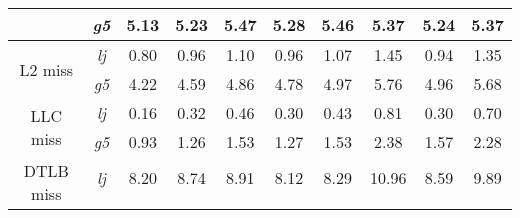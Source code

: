 \begin{table}[h!]
\begin{tabular}{|ccccc|ccccc|}
\multicolumn{1}{|c|}{}                                    & \multicolumn{1}{c|}{\emph{g5}}            & \multicolumn{1}{c|}{5.13}                          & \multicolumn{1}{c|}{5.23}                             & 5.47                         & \multicolumn{1}{c|}{5.28}       & \multicolumn{1}{c|}{5.46}        & \multicolumn{1}{c|}{5.37}                         & \multicolumn{1}{c|}{5.24}       & 5.37        \\ \hline
\multicolumn{1}{|c|}{\multirow{2}{*}{L2 miss}}            & \multicolumn{1}{c|}{\emph{lj}}            & \multicolumn{1}{c|}{0.80}                          & \multicolumn{1}{c|}{0.96}                             & 1.10                         & \multicolumn{1}{c|}{0.96}       & \multicolumn{1}{c|}{1.07}        & \multicolumn{1}{c|}{1.45}                         & \multicolumn{1}{c|}{0.94}       & 1.35        \\ \cline{2-10} 
\multicolumn{1}{|c|}{}                                    & \multicolumn{1}{c|}{\emph{g5}}            & \multicolumn{1}{c|}{4.22}                          & \multicolumn{1}{c|}{4.59}                             & 4.86                         & \multicolumn{1}{c|}{4.78}       & \multicolumn{1}{c|}{4.97}        & \multicolumn{1}{c|}{5.76}                         & \multicolumn{1}{c|}{4.96}       & 5.68        \\ \hline
\multicolumn{1}{|c|}{\multirow{2}{*}{LLC miss}}           & \multicolumn{1}{c|}{\emph{lj}}            & \multicolumn{1}{c|}{0.16}                          & \multicolumn{1}{c|}{0.32}                             & 0.46                         & \multicolumn{1}{c|}{0.30}       & \multicolumn{1}{c|}{0.43}        & \multicolumn{1}{c|}{0.81}                         & \multicolumn{1}{c|}{0.30}       & 0.70        \\ \cline{2-10} 
\multicolumn{1}{|c|}{}                                    & \multicolumn{1}{c|}{\emph{g5}}            & \multicolumn{1}{c|}{0.93}                          & \multicolumn{1}{c|}{1.26}                             & 1.53                         & \multicolumn{1}{c|}{1.27}       & \multicolumn{1}{c|}{1.53}        & \multicolumn{1}{c|}{2.38}                         & \multicolumn{1}{c|}{1.57}       & 2.28        \\ \hline
\multicolumn{1}{|c|}{\multirow{2}{*}{DTLB miss}}          & \multicolumn{1}{c|}{\emph{lj}}            & \multicolumn{1}{c|}{8.20}                          & \multicolumn{1}{c|}{8.74}                             & 8.91                         & \multicolumn{1}{c|}{8.12}       & \multicolumn{1}{c|}{8.29}        & \multicolumn{1}{c|}{10.96}                        & \multicolumn{1}{c|}{8.59}       & 9.89        \\ \cline{2-10} 

\end{tabular}
\end{table}
